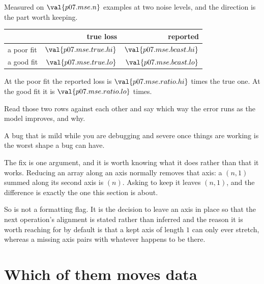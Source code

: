 \begin{fr}
Measured on $\val{p07.mse.n}$ examples at two noise levels, and the direction
is the part worth keeping.

\begin{center}
\begin{tabular}{lrr}
\toprule
 & true loss & reported \\
\midrule
a poor fit & $\val{p07.mse.true.hi}$ & $\val{p07.mse.bcast.hi}$ \\
a good fit & $\val{p07.mse.true.lo}$ & $\val{p07.mse.bcast.lo}$ \\
\bottomrule
\end{tabular}
\end{center}

At the poor fit the reported loss is $\val{p07.mse.ratio.hi}$ times the true
one. At the good fit it is $\val{p07.mse.ratio.lo}$ times.

Read those two rows against each other and say which way the error runs as the
model improves, and why.
\dotline
\nextframe
\end{fr}

\begin{fr}
A bug that is mild while you are debugging and severe once things are working
is the worst shape a bug can have.

\begin{aibox}
The fix is one argument, and it is worth knowing what it does rather than that
it works. Reducing an array along an axis normally removes that axis:
a $(n, 1)$ summed along its second axis is $(n)$. Asking to keep it leaves
$(n, 1)$, and the difference is exactly the one this section is about.

So  is not a formatting flag. It is the decision to leave an
axis in place so that the next operation's alignment is stated rather than
inferred \dash{} and the reason it is worth reaching for by default is that a
kept axis of length $1$ can only ever stretch, whereas a missing axis pairs
with whatever happens to be there.
\end{aibox}
\end{fr}

\section{Which of them moves data}
\label{sec:P07-reshape}

